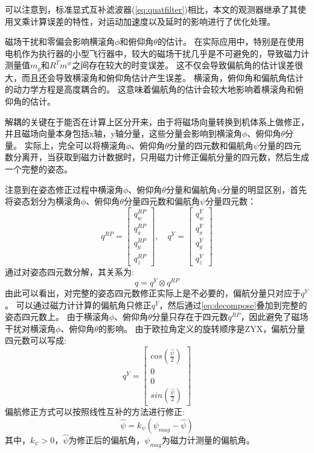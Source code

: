 \documentclass[
  type=master
]{gdutthesis}
\begin{document}
可以注意到，标准显式互补滤波器(\autoref{eq:quatfilter})相比，本文的观测器继承了其使用叉乘计算误差的特性，对运动加速度以及延时的影响进行了优化处理。

磁场干扰和零偏会影响横滚角$\phi$和俯仰角$\theta$的估计。
在实际应用中，特别是在使用电机作为执行器的小型飞行器中，较大的磁场干扰几乎是不可避免的，导致磁力计测量值$m_y$和$R^T m^w$之间存在较大的时变误差。
这不仅会导致偏航角的估计误差很大，而且还会导致横滚角和俯仰角估计产生误差。
横滚角，俯仰角和偏航角估计的动力学方程是高度耦合的。
这意味着偏航角的估计会较大地影响着横滚角和俯仰角的估计。

解耦的关键在于能否在计算上区分开来，由于将磁场向量转换到机体系上做修正，并且磁场向量本身包括x轴，y轴分量，这些分量会影响到横滚角$\phi$、俯仰角$\theta$分量。
实际上，完全可以将横滚角$\phi$、俯仰角$\theta$分量的四元数和偏航角$\psi$分量的四元数分离开，当获取到磁力计数据时，只用磁力计修正偏航分量的四元数，然后生成一个完整的姿态。

注意到在姿态修正过程中横滚角$\phi$、俯仰角$\theta$分量和偏航角$\psi$分量的明显区别，首先将姿态划分为横滚角$\phi$、俯仰角$\theta$分量四元数和偏航角$\psi$分量四元数：\vspace{1ex}
\[
q^{RP} = 
\begin{bmatrix}
	q_w^{RP} \\
	q_x^{RP} \\
	q_y^{RP} \\
	q_z^{RP}
\end{bmatrix},
\hspace{1em}
q^{Y} = 
\begin{bmatrix}
	q_w^{Y} \\
	q_x^{Y} \\
	q_y^{Y} \\
	q_z^{Y}
\end{bmatrix}
\]
通过对姿态四元数分解，其关系为:
\begin{equation}\label{eq:decompose}
	q = q^{Y} \otimes q^{RP}	
\end{equation}
由此可以看出，对完整的姿态四元数修正实际上是不必要的，偏航分量只对应于$q^{Y}$。
可以通过磁力计计算的偏航角只修正$q^{Y}$，然后通过\autoref{eq:decompose}叠加到完整的姿态四元数上。
由于横滚角$\phi$、俯仰角$\theta$分量只存在于四元数$q^{RP}$，因此避免了磁场干扰对横滚角$\phi$、俯仰角$\theta$的影响。
由于欧拉角定义的旋转顺序是ZYX，偏航分量四元数可以写成:
\begin{equation}
	q^{Y} = 
	\begin{bmatrix}
		cos(\frac{\hat{\psi}}{2}) \\
		0 \\
		0 \\
		sin(\frac{\hat{\psi}}{2})
	\end{bmatrix}	
\end{equation}
偏航修正方式可以按照线性互补的方法进行修正:
\begin{equation}
	\hat{\psi} = k_{\psi} (\psi_{mag} - \hat{\psi}) 	
\end{equation}
其中，$k_{\psi} > 0$，$\hat{\psi}$为修正后的偏航角，$\psi_{mag}$为磁力计测量的偏航角。
\end{document}
